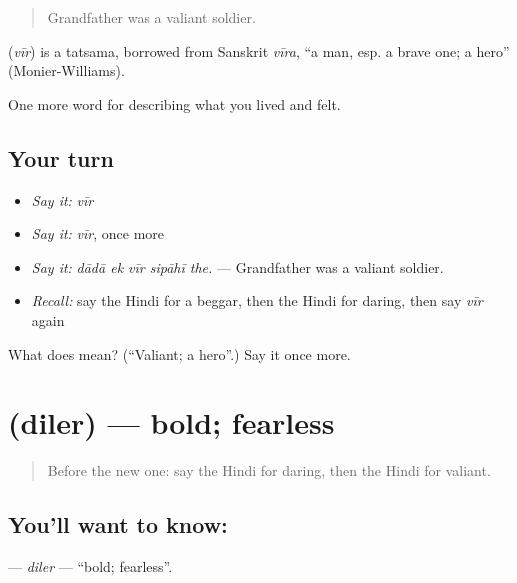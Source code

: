 \begin{quote}
Grandfather was a valiant soldier.
\end{quote}

\begin{cousinweb}
\textbf{} (\emph{vīr}) is a tatsama, borrowed from Sanskrit \emph{vīra}, \textquotedblleft{}a man, esp. a brave one; a hero\textquotedblright{} (Monier-Williams).
\end{cousinweb}

\begin{grammarlens}[title={What you've built}]
One more word for describing what you lived and felt.
\end{grammarlens}

\subsection*{Your turn}
\begin{itemize}
\raggedright
  \item \emph{Say it:} \emph{vīr}
  \item \emph{Say it:} \emph{vīr}, once more
  \item \emph{Say it:} \emph{dādā ek vīr sipāhī the.} — Grandfather was a valiant soldier.
  \item \emph{Recall:} say the Hindi for a beggar, then the Hindi for daring, then say \emph{vīr} again
\end{itemize}

\begin{tcolorbox}[breakable,colback=teal!4,colframe=teal!35!black,title={Before you move on}]
What does  mean? (\textquotedblleft{}Valiant; a hero\textquotedblright{}.) Say it once more.
\end{tcolorbox}
\section[\texorpdfstring{\hi{दिलेर} (diler)}{दिलेर (diler)}]{ (diler) — bold; fearless}

\label{lesson:HI-C470-diler}



\begin{quote}
Before the new one: say the Hindi for daring, then the Hindi for valiant.
\end{quote}

\subsection*{You'll want to know: }
\textbf{} — \emph{diler} — \textquotedblleft{}bold; fearless\textquotedblright{}.

